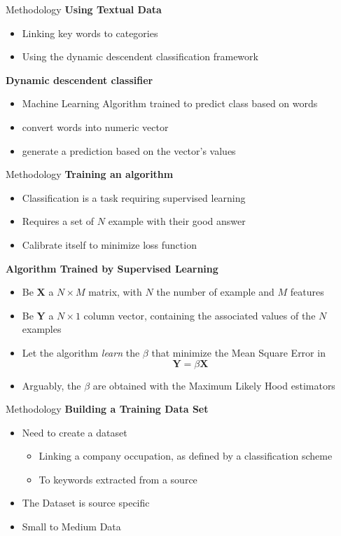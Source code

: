 \begin{frame}[label=metho]{Methodology}
	\textbf{Using Textual Data}
	\begin{itemize}
		\item Linking key words to categories 
		\item Using the dynamic descendent classification framework
	\end{itemize}	
	
	\textbf{Dynamic descendent classifier}
	\begin{itemize}
		\item Machine Learning Algorithm trained to predict class based on words
		\item convert words into numeric vector
		\item generate a prediction based on the vector's values
	\end{itemize}	
	
\end{frame}


\begin{frame}[label=metho]{Methodology}
	\textbf{Training an algorithm}
	\begin{itemize}
		\item Classification is a task requiring supervised learning
		\item Requires a set of $N$ example with their good answer
		\item Calibrate itself to minimize loss function
	\end{itemize}	
	
	\textbf{Algorithm Trained by Supervised Learning}
	\begin{itemize}
		\item Be $\textbf{X}$ a $N\times M$ matrix, with $N$ the number of example and $M$ features
		\item Be $\textbf{Y}$ a $N\times1$ column vector, containing the associated values of the $N$ examples
		\item Let the algorithm \textit{learn} the $\beta$ that minimize the Mean Square Error in 
		$$ \textbf{Y} = \beta\textbf{X} $$
		\item Arguably, the $\beta$ are obtained with the Maximum Likely Hood estimators
	\end{itemize}	
	
\end{frame}


\begin{frame}[label=metho]{Methodology}
	\textbf{Building a Training Data Set}
	\begin{itemize}
		\item Need to create a dataset 
		\begin{itemize}
			\item Linking a company occupation, as defined by a classification scheme
			\item To keywords extracted from a source
		\end{itemize}	
		\item The Dataset is source specific
		\item Small to Medium Data
	
	\end{itemize}	
\end{frame}


